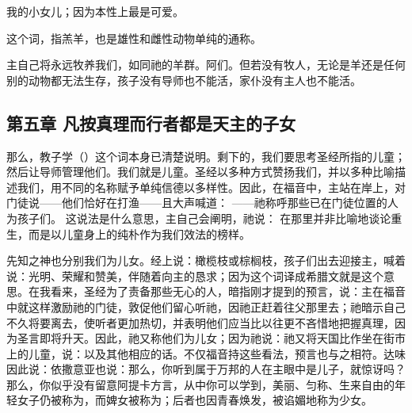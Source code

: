 我的小女儿；因为本性上\newline{}最是可爱。\par

 这个词，指羔羊，也是雄性和雌性动物单纯的通称。\par

主自己将永远牧养我们，如同祂的羊群。阿们。但若没有牧人，无论是羊还是任何别的动物都无法生存，孩子没有导师也不能活，家仆没有主人也不能活。\par


\subsection{第五章  凡按真理而行者都是天主的子女}

那么，教子学（）这个词本身已清楚说明。剩下的，我们要思考圣经所指的儿童；然后让导师管理他们。我们就是儿童。圣经以多种方式赞扬我们，并以多种比喻描述我们，用不同的名称赋予单纯信德以多样性。因此，在福音中，主站在岸上，对门徒说——他们恰好在打渔——且大声喊道：  ——祂称呼那些已在门徒位置的人为孩子们。  这说法是什么意思，主自己会阐明，祂说：  在那里并非比喻地谈论重生，而是以儿童身上的纯朴作为我们效法的榜样。\par

先知之神也分别我们为儿女。经上说：橄榄枝或棕榈枝，孩子们出去迎接主，喊着说：光明、荣耀和赞美，伴随着向主的恳求；因为这个词译成希腊文就是这个意思。在我看来，圣经为了责备那些无心的人，暗指刚才提到的预言，说：主在福音中就这样激励祂的门徒，敦促他们留心听祂，因祂正赶着往父那里去；祂暗示自己不久将要离去，使听者更加热切，并表明他们应当比以往更不吝惜地把握真理，因为圣言即将升天。因此，祂又称他们为儿女；因为祂说：祂又将天国比作坐在街市上的儿童，说：以及其他相应的话。不仅福音持这些看法，预言也与之相符。达味因此说：依撒意亚也说：那么，你听到属于万邦的人在主眼中是儿子，就惊讶吗？那么，你似乎没有留意阿提卡方言，从中你可以学到，美丽、匀称、生来自由的年轻女子仍被称为，而婢女被称为；后者也因青春焕发，被谄媚地称为少女。\par

